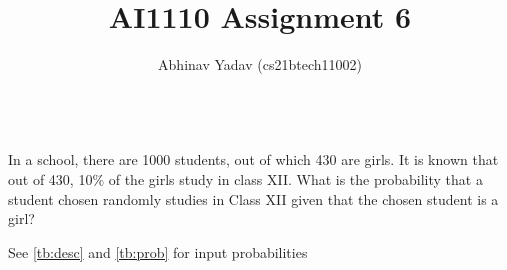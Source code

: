 \documentclass[journal,11pt,twocolumn]{IEEEtran}
\begin{document}
    \title{AI1110 Assignment 6}
    \author{Abhinav Yadav (cs21btech11002)}
    \maketitle
        
        
        \\
    In a school, there are 1000 students, out of which 430 are girls. It is known
that out of 430, 10\% of the girls study in class XII. What is the probability that a student
chosen randomly studies in Class XII given that the chosen student is a girl?

    \solution
    See \autoref{tb:desc} and \autoref{tb:prob} for input probabilities
\end{document}
